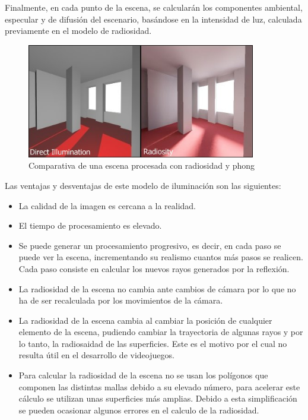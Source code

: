 Finalmente, en cada punto de la escena, se calcularán los componentes ambiental, especular y de difusión del escenario, basándose en la intensidad de luz, calculada previamente en el modelo de radiosidad.
\newline

\begin{figure}[h!]
	\centering
	          \includegraphics[width=10cm]{img/radiosity_comparison.jpg}
	\caption{Comparativa de una escena procesada con radiosidad y phong}
\end{figure}

Las ventajas y desventajas de este modelo de iluminación son las siguientes:
\begin{itemize}
\item La calidad de la imagen es cercana a la realidad.
\item El tiempo de procesamiento es elevado.
\item Se puede generar un procesamiento progresivo, es decir, en cada paso se puede ver la escena, incrementando su realismo cuantos más pasos se realicen. Cada paso  consiste en calcular los nuevos rayos generados por la reflexión.
\item La radiosidad de la escena no cambia ante cambios de cámara por lo que no ha de ser recalculada por los movimientos de la cámara.
\item La radiosidad de la escena cambia al cambiar la posición de cualquier elemento de la escena, pudiendo cambiar la trayectoria de algunas rayos y por lo tanto, la radiosaidad de las superficies. Este es el motivo por el cual no resulta útil en el desarrollo de videojuegos.
\item Para calcular la radiosidad de la escena no se usan los polígonos que componen las distintas mallas debido a su elevado número, para acelerar este cálculo se utilizan unas superficies más amplias. Debido a esta simplificación se pueden ocasionar algunos errores en el calculo de la radiosidad.
\end{itemize}

